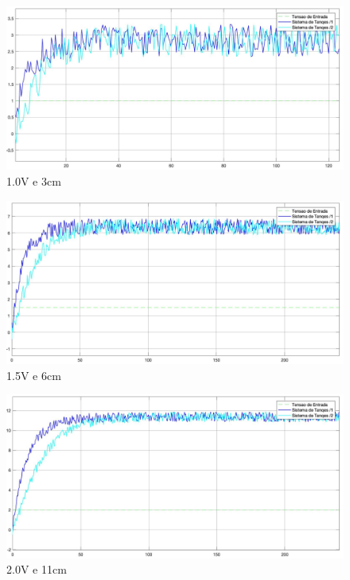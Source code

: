 \documentclass[a4paper,12pt]{article}
\begin{document}
\begin{figure}[H]
	\centering
	\includegraphics[scale=0.20]{./imagens/exp1/V10.jpg}
	\caption{1.0V e 3cm }
\end{figure}

\begin{figure}[H]
	\centering
	\includegraphics[scale=0.20]{./imagens/exp1/V15.jpg}
	\caption{1.5V e 6cm }
\end{figure}

\begin{figure}[H]
	\centering
	\includegraphics[scale=0.20]{./imagens/exp1/V20.jpg}
	\caption{2.0V e 11cm }
\end{figure}
\end{document}
